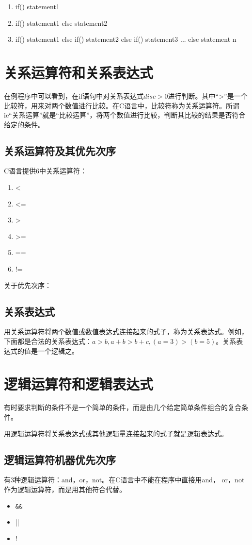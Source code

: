 \begin{enumerate}
	\item if() statement1
	\item if() statement1 else statement2
	\item if() statement1 else if() statement2 else if() statement3 ... else statement n
\end{enumerate}
\section{关系运算符和关系表达式}
在例程序中可以看到，在if语句中对关系表达式$disc>0$进行判断。其中“>”是一个比较符，用来对两个数值进行比较。在C语言中，比较符称为关系运算符。所谓ie“关系运算”就是“比较运算”，将两个数值进行比较，判断其比较的结果是否符合给定的条件。
\subsection{关系运算符及其优先次序}
C语言提供6中关系运算符：
\begin{enumerate}
	\item <
	\item <=
	\item >
	\item >=
	\item ==
	\item !=
\end{enumerate}
关于优先次序：
\subsection{关系表达式}
用关系运算符将两个数值或数值表达式连接起来的式子，称为关系表达式。例如，下面都是合法的关系表达式：$a > b, a + b > b + c, (a = 3) > ( b = 5)$。关系表达式的值是一个逻辑之。
\section{逻辑运算符和逻辑表达式}
有时要求判断的条件不是一个简单的条件，而是由几个给定简单条件组合的复合条件。

用逻辑运算符将关系表达式或其他逻辑量连接起来的式子就是逻辑表达式。
\subsection{逻辑运算符机器优先次序}
有3种逻辑运算符：and，or，not。在C语言中不能在程序中直接用and， or，not作为逻辑运算符，而是用其他符合代替。
\begin{itemize}
	\item \verb|&&|
	\item ||
	\item !
\end{itemize}
